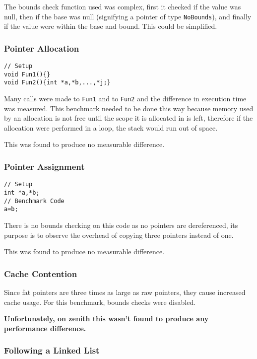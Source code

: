 The bounds check function used was complex, first it checked if the value was null, then if the base was null (signifying a pointer of type \verb!NoBounds!), and finally if the value were within the base and bound.
This could be simplified.

\subsubsection{Pointer Allocation}

\begin{verbatim}
// Setup
void Fun1(){}
void Fun2(){int *a,*b,...,*j;}
\end{verbatim}

Many calls were made to \verb!Fun1! and to \verb!Fun2! and the difference in execution time was measured.
This benchmark needed to be done this way because memory used by an allocation is not free until the scope it is allocated in is left, therefore if the allocation were performed in a loop, the stack would run out of space.

This was found to produce no measurable difference.

\subsubsection{Pointer Assignment}

\begin{verbatim}
// Setup
int *a,*b;
// Benchmark Code
a=b;
\end{verbatim}

There is no bounds checking on this code as no pointers are dereferenced, its purpose is to observe the overhead of copying three pointers instead of one.

This was found to produce no measurable difference.

\subsubsection{Cache Contention}

Since fat pointers are three times as large as raw pointers, they cause increased cache usage.
For this benchmark, bounds checks were disabled.

\textbf{Unfortunately, on zenith this wasn't found to produce any performance difference.}

\subsubsection{Following a Linked List}

